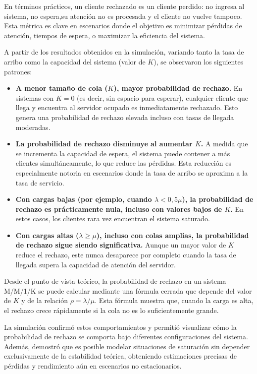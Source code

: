 \documentclass[12pt]{article}
\begin{document}
\begin{itemize}
    En términos prácticos, un cliente rechazado es un cliente perdido: no ingresa al sistema, no espera,su atención no es procesada y el cliente no vuelve tampoco. Esta métrica es clave en escenarios donde el objetivo es minimizar pérdidas de atención, tiempos de espera, o maximizar la eficiencia del sistema.

    A partir de los resultados obtenidos en la simulación, variando tanto la tasa de arribo como la capacidad del sistema (valor de $K$), se observaron los siguientes patrones:

    \begin{itemize}
        \item \textbf{A menor tamaño de cola ($K$), mayor probabilidad de rechazo.} En sistemas con $K = 0$ (es decir, sin espacio para esperar), cualquier cliente que llega y encuentra al servidor ocupado es inmediatamente rechazado. Esto genera una probabilidad de rechazo elevada incluso con tasas de llegada moderadas.
        
        \item \textbf{La probabilidad de rechazo disminuye al aumentar $K$.} A medida que se incrementa la capacidad de espera, el sistema puede contener a más clientes simultáneamente, lo que reduce las pérdidas. Esta reducción es especialmente notoria en escenarios donde la tasa de arribo se aproxima a la tasa de servicio.
        
        \item \textbf{Con cargas bajas (por ejemplo, cuando $\lambda < 0{,}5 \mu$), la probabilidad de rechazo es prácticamente nula, incluso con valores bajos de $K$.} En estos casos, los clientes rara vez encuentran el sistema saturado.
        
        \item \textbf{Con cargas altas ($\lambda \geq \mu$), incluso con colas amplias, la probabilidad de rechazo sigue siendo significativa.} Aunque un mayor valor de $K$ reduce el rechazo, este nunca desaparece por completo cuando la tasa de llegada supera la capacidad de atención del servidor.
    \end{itemize}

    Desde el punto de vista teórico, la probabilidad de rechazo en un sistema M/M/1/K se puede calcular mediante una fórmula cerrada que depende del valor de $K$ y de la relación $\rho = \lambda / \mu$. Esta fórmula muestra que, cuando la carga es alta, el rechazo crece rápidamente si la cola no es lo suficientemente grande.

    La simulación confirmó estos comportamientos y permitió visualizar cómo la probabilidad de rechazo se comporta bajo diferentes configuraciones del sistema. Además, demostró que es posible modelar situaciones de saturación sin depender exclusivamente de la estabilidad teórica, obteniendo estimaciones precisas de pérdidas y rendimiento aún en escenarios no estacionarios.


\end{itemize}
\end{document}
